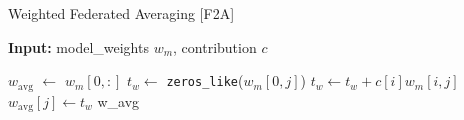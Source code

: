 \begin{algorithm}[t]
\caption{Weighted Federated Averaging [F2A]}
\label{alg:weighted_fed_avg}
\textbf{ Input:} model\_weights $w_m$, contribution $c$
\begin{algorithmic}[1]
    \State $w_{\mathrm{avg}}$ $\gets$ $w_m[0, :]$ 
        \State $t_w \gets$ \texttt{zeros\_like}($w_m[0, j]$)
         
            \State $t_w \gets t_w + c[i]  w_m[i, j]$
        \EndFor
        \State $w_{\mathrm{avg}}[j] \gets t_w$
    \EndFor
    \State \Return w\_avg
\end{algorithmic}
\end{algorithm}

